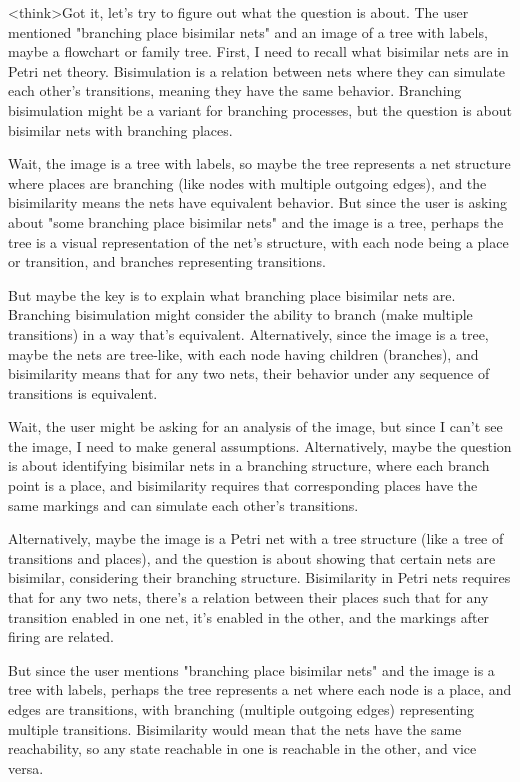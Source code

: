 <think>Got it, let's try to figure out what the question is about. The user mentioned "branching place bisimilar nets" and an image of a tree with labels, maybe a flowchart or family tree. First, I need to recall what bisimilar nets are in Petri net theory. Bisimulation is a relation between nets where they can simulate each other's transitions, meaning they have the same behavior. Branching bisimulation might be a variant for branching processes, but the question is about bisimilar nets with branching places.

Wait, the image is a tree with labels, so maybe the tree represents a net structure where places are branching (like nodes with multiple outgoing edges), and the bisimilarity means the nets have equivalent behavior. But since the user is asking about "some branching place bisimilar nets" and the image is a tree, perhaps the tree is a visual representation of the net's structure, with each node being a place or transition, and branches representing transitions.

But maybe the key is to explain what branching place bisimilar nets are. Branching bisimulation might consider the ability to branch (make multiple transitions) in a way that's equivalent. Alternatively, since the image is a tree, maybe the nets are tree-like, with each node having children (branches), and bisimilarity means that for any two nets, their behavior under any sequence of transitions is equivalent.

Wait, the user might be asking for an analysis of the image, but since I can't see the image, I need to make general assumptions. Alternatively, maybe the question is about identifying bisimilar nets in a branching structure, where each branch point is a place, and bisimilarity requires that corresponding places have the same markings and can simulate each other's transitions.

Alternatively, maybe the image is a Petri net with a tree structure (like a tree of transitions and places), and the question is about showing that certain nets are bisimilar, considering their branching structure. Bisimilarity in Petri nets requires that for any two nets, there's a relation between their places such that for any transition enabled in one net, it's enabled in the other, and the markings after firing are related.

But since the user mentions "branching place bisimilar nets" and the image is a tree with labels, perhaps the tree represents a net where each node is a place, and edges are transitions, with branching (multiple outgoing edges) representing multiple transitions. Bisimilarity would mean that the nets have the same reachability, so any state reachable in one is reachable in the other, and vice versa.


